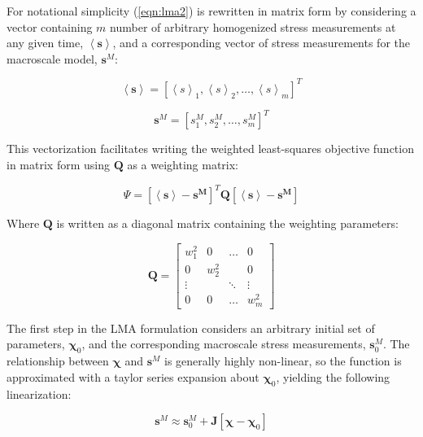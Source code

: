 For notational simplicity (\ref{eqn:lma2}) is rewritten in matrix form by considering a vector containing $m$ number of arbitrary homogenized stress measurements at any given time, $\left< \mathbf{s} \right>$, and a corresponding vector of stress measurements for the macroscale model, $\mathbf{s}^M$:

\begin{equation}
\left< \mathbf{s} \right>=\left[\left< s \right>_1, \left< s \right>_2, \dots, \left< s \right>_m \right]^T
\label{eqn:lma3}
\end{equation}

\begin{equation}
\mathbf{s}^M=\left[s^M_1, s^M_2, \dots, s^M_m \right]^T
\label{eqn:lma4}
\end{equation}

This vectorization facilitates writing the weighted least-squares objective function in matrix form using $\mathbf{Q}$ as a weighting matrix:

\begin{equation}
\Psi=\left[\left<\mathbf{s}\right>-\mathbf{s^M}\right]^T \mathbf{Q} \left[\left<\mathbf{s}\right>-\mathbf{s^M}\right]
\label{eqn:lma5}
\end{equation}

Where $\mathbf{Q}$ is written as a diagonal matrix containing the weighting parameters:

\begin{equation}
\mathbf{Q}=\begin{bmatrix}
w_1^2 & 0     & \dots  & 0\\ 
0     & w_2^2 &        & 0\\ 
\vdots&       & \ddots & \vdots \\ 
0     & 0     & \dots  & w_m^2
\end{bmatrix}
\label{eqn:lma6}
\end{equation}

The first step in the LMA formulation considers an arbitrary initial set of parameters, $\boldsymbol{\chi}_0$, and the corresponding macroscale stress measurements, $\mathbf{s}^M_0$. The relationship between $\boldsymbol{\chi}$ and $\mathbf{s}^M$ is generally highly non-linear, so the function is approximated with a taylor series expansion about $\boldsymbol{\chi}_0$, yielding the following linearization:

\begin{equation}
\mathbf{s}^M \approx \mathbf{s}^M_0 + \mathbf{J} \left[ \boldsymbol{\chi}-\boldsymbol{\chi}_0 \right]
\label{eqn:lma7}
\end{equation}

